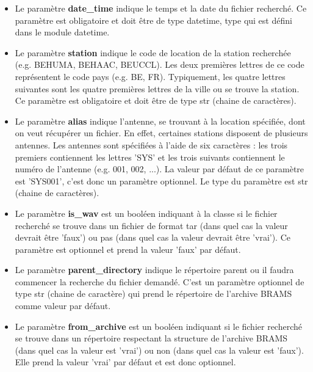 \documentclass[11pt]{article}
\begin{document}
\begin{itemize}
    \item Le paramètre \textbf{date\_time} indique le temps et la date du fichier recherché.
          Ce paramètre est obligatoire et doit être de type datetime, type qui est défini dans le module datetime.
    \item Le paramètre \textbf{station} indique le code de location de la station recherchée (e.g. BEHUMA, BEHAAC, BEUCCL).
          Les deux premières lettres de ce code représentent le code pays (e.g. BE, FR).
          Typiquement, les quatre lettres suivantes sont les quatre premières lettres de la ville ou se trouve la station.
          Ce paramètre est obligatoire et doit être de type str (chaine de caractères).
    \item Le paramètre \textbf{alias} indique l'antenne, se trouvant à la location spécifiée, dont on veut récupérer un fichier.
          En effet, certaines stations disposent de plusieurs antennes.
          Les antennes sont spécifiées à l'aide de six caractères : les trois premiers contiennent les lettres 'SYS' et les trois suivants contiennent le numéro de l'antenne (e.g. 001, 002, ...).
          La valeur par défaut de ce paramètre est 'SYS001', c'est donc un paramètre optionnel.
          Le type du paramètre est str (chaine de caractères).
    \item Le paramètre \textbf{is\_wav} est un booléen indiquant à la classe si le fichier recherché se trouve dans un fichier de format tar (dans quel cas la valeur devrait être 'faux') ou pas (dans quel cas la valeur devrait être 'vrai').
          Ce paramètre est optionnel et prend la valeur 'faux' par défaut.
    \item Le paramètre \textbf{parent\_directory} indique le répertoire parent ou il faudra commencer la recherche du fichier demandé.
          C'est un paramètre optionnel de type str (chaine de caractère) qui prend le répertoire de l'archive BRAMS comme valeur par défaut.
    \item Le paramètre \textbf{from\_archive} est un booléen indiquant si le fichier recherché se trouve dans un répertoire respectant la structure de l'archive BRAMS (dans quel cas la valeur est 'vrai') ou non (dans quel cas la valeur est 'faux').
          Elle prend la valeur 'vrai' par défaut et est donc optionnel.
\end{itemize}
\end{document}
